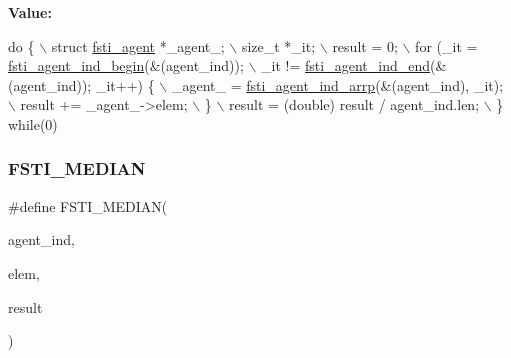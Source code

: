 {\bfseries Value\+:}
\begin{DoxyCode}
\textcolor{keywordflow}{do} \{                         \(\backslash\)
        struct \mbox{\hyperlink{structfsti__agent}{fsti\_agent}} *\_agent\_;                                     \(\backslash\)
        size\_t *\_it;                                                    \(\backslash\)
        result = 0;                                                     \(\backslash\)
        for (\_it = \mbox{\hyperlink{fsti-agent_8c_af8ec082c043d0719f2933f78c9b74879}{fsti\_agent\_ind\_begin}}(&(agent\_ind));                  \(\backslash\)
             \_it != \mbox{\hyperlink{fsti-agent_8c_a0a007fca1a85b26dc9f890b5c9f5649a}{fsti\_agent\_ind\_end}}(&(agent\_ind)); \_it++) \{          \(\backslash\)
            \_agent\_ = \mbox{\hyperlink{fsti-agent_8c_a0d3fcfadb1159b63508be133b30f8df7}{fsti\_agent\_ind\_arrp}}(&(agent\_ind), \_it);           \(\backslash\)
            result += \_agent\_->elem;                                    \(\backslash\)
        \}                                                               \(\backslash\)
        result = (double) result / agent\_ind.len;                       \(\backslash\)
    \} \textcolor{keywordflow}{while}(0)
\end{DoxyCode}
\mbox{\label{fsti-report_8h_abecbb06bd9bca39305faadb443899fa9}} 
\subsubsection{\texorpdfstring{F\+S\+T\+I\+\_\+\+M\+E\+D\+I\+AN}{FSTI\_MEDIAN}}
{\footnotesize\ttfamily \#define F\+S\+T\+I\+\_\+\+M\+E\+D\+I\+AN(\begin{DoxyParamCaption}\item[{}]{agent\+\_\+ind,  }\item[{}]{elem,  }\item[{}]{result }\end{DoxyParamCaption})}

